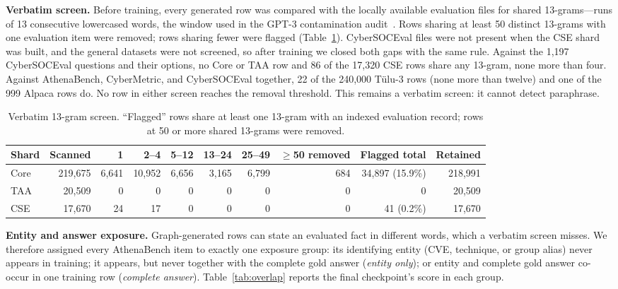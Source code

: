 \documentclass[conference]{IEEEtran}
\begin{document}
\textbf{Verbatim screen.} Before training, every generated row was compared with the locally available evaluation files for shared 13-grams---runs of 13 consecutive lowercased words, the window used in the GPT-3 contamination audit~\cite{brown2020language}. Rows sharing at least 50 distinct 13-grams with one evaluation item were removed; rows sharing fewer were flagged (Table~\ref{tab:contam}). CyberSOCEval files were not present when the CSE shard was built, and the general datasets were not screened, so after training we closed both gaps with the same rule. Against the 1,197 CyberSOCEval questions and their options, no Core or TAA row and 86 of the 17,320 CSE rows share any 13-gram, none more than four. Against AthenaBench, CyberMetric, and CyberSOCEval together, 22 of the 240,000 T\"ulu-3 rows (none more than twelve) and one of the 999 Alpaca rows do. No row in either screen reaches the removal threshold. This remains a verbatim screen: it cannot detect paraphrase.

\begin{table}[t]
\caption{Verbatim 13-gram screen. ``Flagged'' rows share at least one 13-gram with an indexed evaluation record; rows at 50 or more shared 13-grams were removed.}
\label{tab:contam}
\centering
\footnotesize
\setlength{\tabcolsep}{3.0pt}
\begin{tabular}{@{}lrrrrrrrrr@{}}
\toprule
Shard & Scanned & 1 & 2--4 & 5--12 & 13--24 & 25--49 & $\geq$50 removed & Flagged total & Retained \\
\midrule
Core & 219,675 & 6,641 & 10,952 & 6,656 & 3,165 & 6,799 & 684 & 34,897 (15.9\%) & 218,991 \\
TAA & 20,509 & 0 & 0 & 0 & 0 & 0 & 0 & 0 & 20,509 \\
CSE & 17,670 & 24 & 17 & 0 & 0 & 0 & 0 & 41 (0.2\%) & 17,670 \\
\bottomrule
\end{tabular}
\end{table}

\textbf{Entity and answer exposure.} Graph-generated rows can state an evaluated fact in different words, which a verbatim screen misses. We therefore assigned every AthenaBench item to exactly one exposure group: its identifying entity (CVE, technique, or group alias) never appears in training; it appears, but never together with the complete gold answer (\emph{entity only}); or entity and complete gold answer co-occur in one training row (\emph{complete answer}). Table~\ref{tab:overlap} reports the final checkpoint's score in each group.
\end{document}
